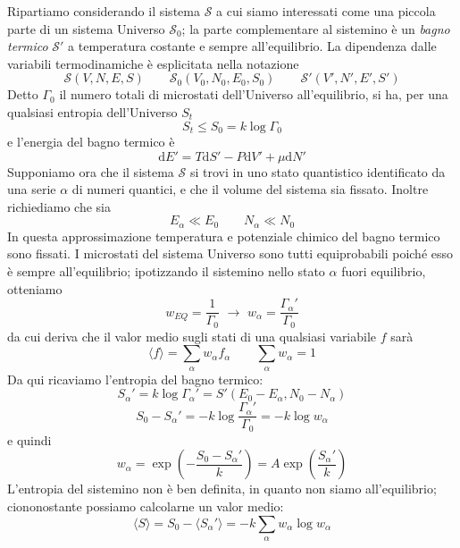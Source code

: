 \documentclass[a4paper]{report}
\begin{document}
Ripartiamo considerando il sistema $\mathcal{S}$ a cui siamo interessati come una piccola parte di un sistema Universo $\mathcal{S}_0$; la parte complementare al sistemino è un \textit{bagno termico} $\mathcal{S}'$ a temperatura costante e sempre all'equilibrio. La dipendenza dalle variabili termodinamiche è esplicitata nella notazione
\begin{equation}
    \mathcal{S}(V,N,E,S)\qquad \mathcal{S}_0(V_0,N_0,E_0,S_0) \qquad
    \mathcal{S}'(V',N',E',S')
\end{equation}
Detto $\Gamma_0$ il numero totali di microstati dell'Universo all'equilibrio, si ha, per una qualsiasi entropia dell'Universo $S_t$ 
\begin{equation}
    S_t \leq S_0 = k \log \Gamma_0
\end{equation}
e l'energia del bagno termico è
\begin{equation}
    \mathrm{d}E' = T \mathrm{d}S' - P\mathrm{d}V' + \mu \mathrm{d}N'
\end{equation}
Supponiamo ora che il sistema $\mathcal{S}$ si trovi in uno stato quantistico identificato da una serie $\alpha$ di numeri quantici, e che il volume del sistema sia fissato. Inoltre richiediamo che sia 
\begin{equation}
    E_\alpha \ll E_0 \qquad N_\alpha \ll N_0
    \label{approx1}
\end{equation}
In questa approssimazione temperatura e potenziale chimico del bagno termico sono fissati. I microstati del sistema Universo sono tutti equiprobabili poiché esso è sempre all'equilibrio; ipotizzando il sistemino nello stato $\alpha$ fuori equilibrio, otteniamo
\begin{equation}
    w_{EQ} = \frac{1}{\Gamma_0} \,\,\rightarrow\,\, w_\alpha = \frac{\Gamma_\alpha'}{\Gamma_0}
\end{equation}
da cui deriva che il valor medio sugli stati di una qualsiasi variabile $f$ sarà
\begin{equation}
    \langle f\rangle = \sum_\alpha w_\alpha f_\alpha \qquad \sum_\alpha w_\alpha = 1
\end{equation}
Da qui ricaviamo l'entropia del bagno termico:
\begin{equation}
    S_\alpha' = k \log \Gamma_\alpha' = S'(E_0 - E_\alpha, N_0 - N_\alpha)
\end{equation}
\begin{equation}
    S_0 - S_\alpha' = -k \log \frac{\Gamma_\alpha'}{\Gamma_0} = -k\log w_\alpha
\end{equation}
e quindi
\begin{equation}
    w_\alpha = \exp\left(-\frac{S_0 - S_\alpha'}{k}\right) = A\exp\left(\frac{S_\alpha'}{k}\right)
    \label{pesi_entropia}
\end{equation}
L'entropia del sistemino non è ben definita, in quanto non siamo all'equilibrio; ciononostante possiamo calcolarne un valor medio:
\begin{equation}
    \langle S\rangle = S_0 - \langle S_\alpha'\rangle = -k \sum_\alpha w_\alpha \log w_\alpha  
    \label{avgentropy}
\end{equation}
\end{document}
